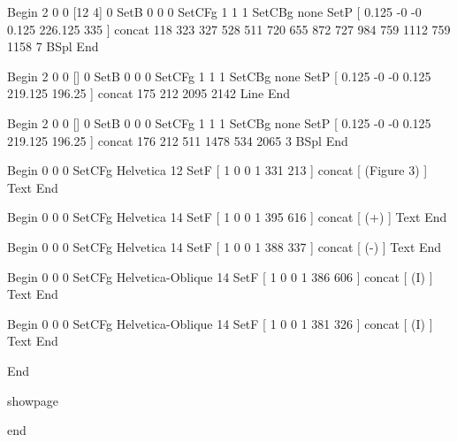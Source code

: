 Begin %
2 0 0 [12 4] 0 SetB
0 0 0 SetCFg
1 1 1 SetCBg
none SetP %
[ 0.125 -0 -0 0.125 226.125 335 ] concat
118 323
327 528
511 720
655 872
727 984
759 1112
759 1158
7 BSpl
End

Begin %
2 0 0 [] 0 SetB
0 0 0 SetCFg
1 1 1 SetCBg
none SetP %
[ 0.125 -0 -0 0.125 219.125 196.25 ] concat
175 212 2095 2142 Line
End

Begin %
2 0 0 [] 0 SetB
0 0 0 SetCFg
1 1 1 SetCBg
none SetP %
[ 0.125 -0 -0 0.125 219.125 196.25 ] concat
176 212
511 1478
534 2065
3 BSpl
End

Begin %
0 0 0 SetCFg
Helvetica 12 SetF
[ 1 0 0 1 331 213 ] concat
[
(Figure 3)
] Text
End

Begin %
0 0 0 SetCFg
Helvetica 14 SetF
[ 1 0 0 1 395 616 ] concat
[
(+)
] Text
End

Begin %
0 0 0 SetCFg
Helvetica 14 SetF
[ 1 0 0 1 388 337 ] concat
[
(-)
] Text
End

Begin %
0 0 0 SetCFg
Helvetica-Oblique 14 SetF
[ 1 0 0 1 386 606 ] concat
[
(I)
] Text
End

Begin %
0 0 0 SetCFg
Helvetica-Oblique 14 SetF
[ 1 0 0 1 381 326 ] concat
[
(I)
] Text
End

End %

showpage


end
